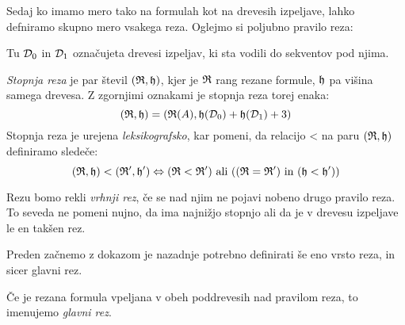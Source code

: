 Sedaj ko imamo mero tako na formulah kot na drevesih izpeljave, lahko defniramo skupno mero vsakega reza. Oglejmo si poljubno pravilo reza:
\begin{prooftree} \label{rez general}


\end{prooftree}
Tu $\D_0$ in $\D_1$ označujeta drevesi izpeljav, ki sta vodili do sekventov pod njima.

\begin{definicija} \label{stopnja}
    \emph{Stopnja reza} je par števil $(\R,\h)$, kjer je $\R$ rang rezane formule, $\h$ pa višina samega drevesa. Z zgornjimi oznakami je stopnja reza torej enaka:
    $$
    (\R,\h) = (\R(A), \h(\D_0) +\h(\D_1) + 3)
    $$
    Stopnja reza je urejena \emph{leksikografsko}, kar pomeni, da relacijo < na paru $(\R,\h)$ definiramo sledeče:
    $$
    (\R,\h) < (\R',\h') \Leftrightarrow (\R < \R') \text{ ali } ((\R = \R') \text{ in } (\h < \h'))
    $$
\end{definicija}
\begin{definicija} \label{najnizji}
    Rezu bomo rekli \emph{vrhnji rez}, če se nad njim ne pojavi nobeno drugo pravilo reza. To seveda ne pomeni nujno, da ima najnižjo stopnjo ali da je v drevesu izpeljave le en takšen rez.
\end{definicija}

Preden začnemo z dokazom je nazadnje potrebno definirati še eno vrsto reza, in sicer glavni rez.

\begin{definicija} \label{gl rez}
    Če je rezana formula vpeljana v obeh poddrevesih nad pravilom reza, to imenujemo \emph{glavni rez}.
\end{definicija}

